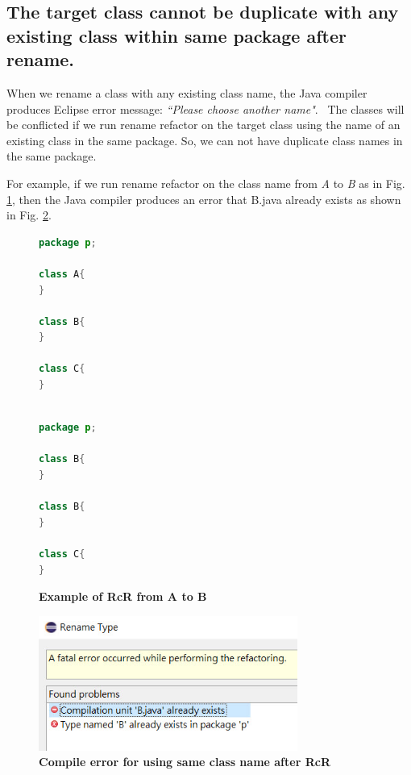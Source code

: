 \subsection{The target class cannot be duplicate with any existing class within same package after rename.}

When we rename a class with any existing class name, the Java compiler produces Eclipse error message: \textit{``Please choose another name"}.~\cite{EclipseWebPage} The classes will be conflicted if we run rename refactor on the target class using the name of an existing class in the same package. So, we can not have duplicate class names in the same package. 

For example, if we run rename refactor on the class name from \textsl{A} to \textsl{B} as in Fig. \ref{fig:afterrr}, then the Java compiler produces an error that B.java already exists as shown in Fig. \ref{fig:renameclassname}.

\begin{figure}[th]
\centering
\begin{minipage}[t]{0.45\linewidth}
\begin{lstlisting}[language=java, basicstyle=\scriptsize\ttfamily,frame=single]
package p;

class A{
}
	
class B{
}

class C{
}
 
\end{lstlisting}
\end{minipage}
\hfill
\begin{minipage}[t]{0.45\linewidth}
\begin{lstlisting}[language=java, basicstyle=\scriptsize\ttfamily,frame=single]
package p;

class B{
}	

class B{
}

class C{
}

\end{lstlisting}
\end{minipage}
\caption{\textbf{Example of RcR from A to B}}
\label{fig:afterrr}
\end{figure}

\begin{figure}[H]
\centerline{\includegraphics[width=85mm,scale=0.5]{SCN.jpg}}
\caption{\textbf{Compile error for using same class name after RcR}}
\label{fig:renameclassname}
\end{figure}


